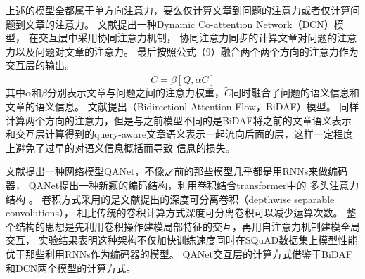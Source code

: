 
上述的模型全都属于单方向注意力，要么仅计算文章到问题的注意力或者仅计算问题到文章的注意力。
文献\cite{DCN}提出一种Dynamic Co-attention Network（DCN）模型，
在交互层中采用协同注意力机制，
协同注意力同步的计算文章对问题的注意力以及问题对文章的注意力。
最后按照公式（9）融合两个两个方向的注意力作为交互层的输出。
\begin{equation}
\widetilde{C}=\beta[Q,\alpha C]
\end{equation}
其中$\alpha$和$\beta$分别表示文章与问题之间的注意力权重，$\widetilde{C}$同时融合了问题的语义信息和文章的语义信息。
文献\cite{BiDAF}提出（Bidirectionl Attention Flow，BiDAF）模型。
同样计算两个方向的注意力，但是与之前模型不同的是BiDAF将之前的文章语义表示和交互层计算得到的query-aware文章语义表示一起流向后面的层，这样一定程度上避免了过早的对语义信息概括而导致
信息的损失。


文献\cite{QANet}提出一种网络模型QANet，不像之前的那些模型几乎都是用RNNs来做编码器，
QANet提出一种新颖的编码结构，利用卷积结合transformer中的
多头注意力结构
。
卷积方式采用的是文献\cite{DSC}提出的深度可分离卷积（depthwise 
separable convolutions），
相比传统的卷积计算方式深度可分离卷积可以减少运算次数。
整个结构的思想是先利用卷积操作建模局部特征的交互，再用自注意力机制建模全局交互，
实验结果表明这种架构不仅加快训练速度同时在SQuAD数据集上模型性能优于那些利用RNNs作为编码器的模型。
QANet交互层的计算方式借鉴于BiDAF和DCN两个模型的计算方式。

